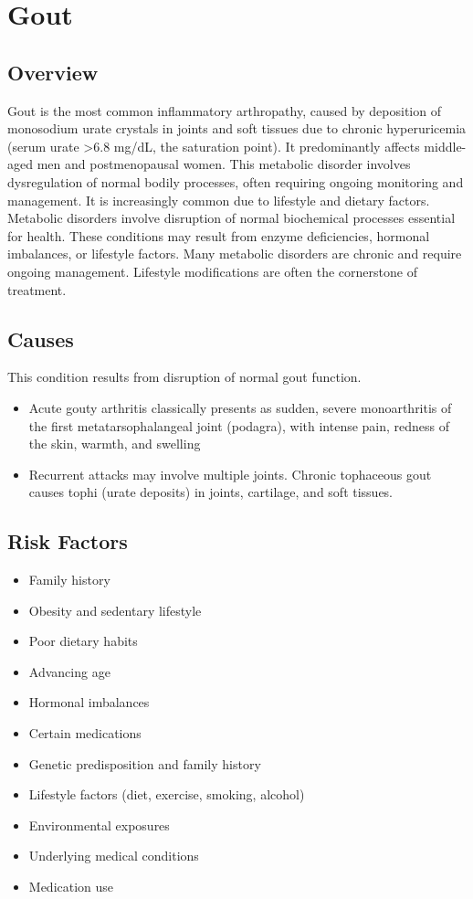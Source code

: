 \chapter{Gout}
\label{sec:Gout}

\section{Overview}
Gout is the most common inflammatory arthropathy, caused by deposition of monosodium urate crystals in joints and soft tissues due to chronic hyperuricemia (serum urate >6.8 mg/dL, the saturation point). It predominantly affects middle-aged men and postmenopausal women. This metabolic disorder involves dysregulation of normal bodily processes, often requiring ongoing monitoring and management. It is increasingly common due to lifestyle and dietary factors. Metabolic disorders involve disruption of normal biochemical processes essential for health. These conditions may result from enzyme deficiencies, hormonal imbalances, or lifestyle factors. Many metabolic disorders are chronic and require ongoing management. Lifestyle modifications are often the cornerstone of treatment.
\section{Causes}
This condition results from disruption of normal gout function.

\begin{itemize}[noitemsep]
  \item Acute gouty arthritis classically presents as sudden, severe monoarthritis of the first metatarsophalangeal joint (podagra), with intense pain, redness of the skin, warmth, and swelling
  \item Recurrent attacks may involve multiple joints. Chronic tophaceous gout causes tophi (urate deposits) in joints, cartilage, and soft tissues.
\end{itemize}
\section{Risk Factors}


\begin{itemize}[noitemsep]
  \item Family history
  \item Obesity and sedentary lifestyle
  \item Poor dietary habits
  \item Advancing age
  \item Hormonal imbalances
  \item Certain medications
  \item Genetic predisposition and family history
  \item Lifestyle factors (diet, exercise, smoking, alcohol)
  \item Environmental exposures
  \item Underlying medical conditions
  \item Medication use
\end{itemize}

